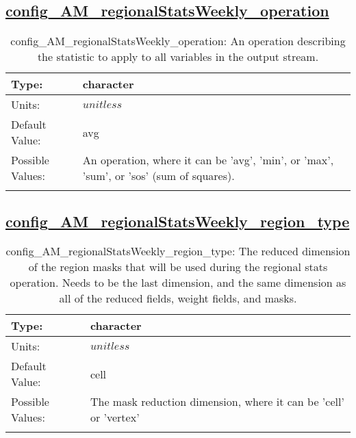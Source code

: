 \subsection[config\_AM\_regionalStatsWeekly\_operation]{\hyperref[sec:nm_tab_AM_regionalStatsWeekly]{config\_AM\_regionalStatsWeekly\_operation}}
\label{subsec:nm_sec_config_AM_regionalStatsWeekly_operation}
\begin{center}
\begin{longtable}{| p{2.0in} || p{4.0in} |}
    \hline
    Type: & character \\
    \hline
    Units: & $unitless$ \\
    \hline
    Default Value: & avg \\
    \hline
    Possible Values: & An operation, where it can be 'avg', 'min', or 'max', 'sum', or 'sos' (sum of squares). \\
    \hline
    \caption{config\_AM\_regionalStatsWeekly\_operation: An operation describing the statistic to apply to all variables in the output stream.}
\end{longtable}
\end{center}
\subsection[config\_AM\_regionalStatsWeekly\_region\_type]{\hyperref[sec:nm_tab_AM_regionalStatsWeekly]{config\_AM\_regionalStatsWeekly\_region\_type}}
\label{subsec:nm_sec_config_AM_regionalStatsWeekly_region_type}
\begin{center}
\begin{longtable}{| p{2.0in} || p{4.0in} |}
    \hline
    Type: & character \\
    \hline
    Units: & $unitless$ \\
    \hline
    Default Value: & cell \\
    \hline
    Possible Values: & The mask reduction dimension, where it can be 'cell' or 'vertex' \\
    \hline
    \caption{config\_AM\_regionalStatsWeekly\_region\_type: The reduced dimension of the region masks that will be used during the regional stats operation. Needs to be the last dimension, and the same dimension as all of the reduced fields, weight fields, and masks.}
\end{longtable}
\end{center}

